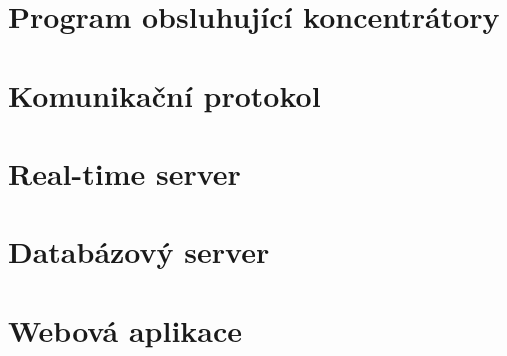 \chapter{Program obsluhující koncentrátory}

\chapter{Komunikační protokol}

\chapter{Real-time server}

\chapter{Databázový server}

\chapter{Webová aplikace}